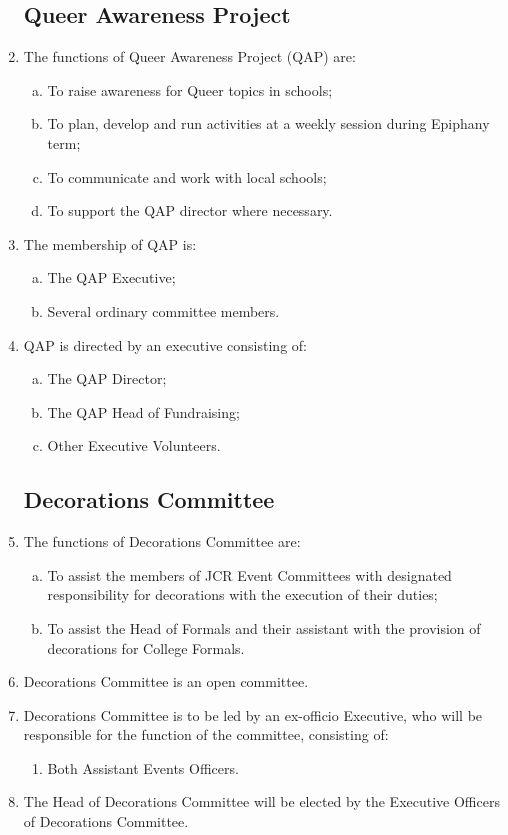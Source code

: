 \documentclass[12pt]{article}
\begin{document}
\begin{enumerate}
        \subsection{Queer Awareness Project}
    \item The functions of Queer Awareness Project (QAP) are:
    \begin{enumerate}[(a)]
        \item To raise awareness for Queer topics in schools;
        \item To plan, develop and run activities at a weekly session during Epiphany term;
        \item To communicate and work with local schools;
        \item To support the QAP director where necessary.
    \end{enumerate}
    \item The membership of QAP is:
    \begin{enumerate}[(a)]
        \item The QAP Executive;
        \item Several ordinary committee members.
    \end{enumerate}
        \item QAP is directed by an executive consisting of:
    \begin{enumerate}[(a)]
        \item The QAP Director;
        \item The QAP Head of Fundraising;
        \item Other Executive Volunteers.
    \end{enumerate}


    \subsection{Decorations Committee}
    \item The functions of Decorations Committee are:
    \begin{enumerate}[(a)]
        \item To assist the members of JCR Event Committees with designated responsibility for decorations with the execution of their duties;
        \item To assist the Head of Formals and their assistant with the provision of decorations for College Formals.
    \end{enumerate}
    \item Decorations Committee is an open committee.
    \item Decorations Committee is to be led by an ex-officio Executive, who will be responsible for the function of the committee, consisting of:
    \begin{enumerate}
        \item Both Assistant Events Officers.
    \end{enumerate}
    \item The Head of Decorations Committee will be elected by the Executive Officers of Decorations Committee.


\end{enumerate}
\end{document}
